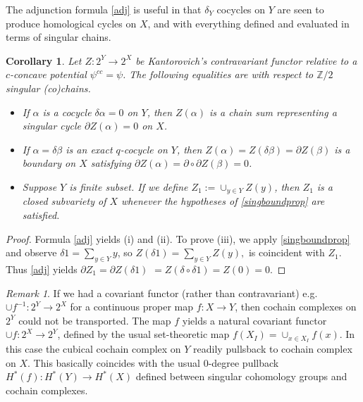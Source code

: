 \documentclass[12pt]{amsart}
\newtheorem{cor}{Corollary}
\theoremstyle{definition}
\theoremstyle{remark}
\newtheorem{rem}{Remark}
\newcommand{\bZ}{\mathbb{Z}}
\newcommand{\del}{\partial}
\begin{document}
The adjunction formula \eqref{adj} is useful in that $\delta_Y$ cocycles on $Y$ are seen to produce homological cycles on $X$, and with everything defined and evaluated in terms of singular chains. %

\begin{cor} \label{cycle}
Let $Z:2^Y \to 2^X$ be Kantorovich's contravariant functor relative to a $c$-concave potential $\psi^{cc}=\psi$. The following equalities are with respect to $\bZ/2$ singular (co)chains. 
\begin{itemize}
\item[(i)] If $\alpha$ is a cocycle $\delta \alpha = 0$ on $Y$, then $Z(\alpha)$ is a chain sum representing a singular cycle $\del Z(\alpha)=0$ on $X$. 
\item[(ii)] If $\alpha=\delta \beta$ is an exact $q$-cocycle on $Y$, then $Z(\alpha)=Z(\delta \beta)=\del Z(\beta)$ is a boundary on $X$ satisfying $\del Z(\alpha)=\del \circ \del Z(\beta)=0$.
\item[(iii)] Suppose $Y$ is finite subset. If we define $Z_1:=\cup_{y\in Y} Z(y)$, then $Z_1$ is a closed subvariety of $X$ whenever the hypotheses of \ref{singboundprop} are satisfied. 
\end{itemize}
\end{cor}
\begin{proof}
Formula \eqref{adj} yields (i) and (ii). To prove (iii), we apply \ref{singboundprop} and observe $\delta 1= \sum_{y\in Y} y$, so $Z(\delta 1)=\sum_{y\in Y} Z(y),$ is coincident with $Z_1$. Thus \eqref{adj} yields $\del Z_1=\del Z(\delta 1)$ $=Z(\delta \circ \delta 1)=Z(0)=0.$ 
\end{proof}



\begin{rem}
If we had a covariant functor (rather than contravariant) e.g. $\cup f^{-1}: 2^Y \to 2^X$ for a continuous proper map $f: X\to Y$, then cochain complexes on $2^Y$ could not be transported. The map $f$ yields a natural covariant functor $\cup f: 2^X \to 2^Y$, defined by the usual set-theoretic map $f(X_I)=\cup_{x\in X_I} f(x)$. In this case the cubical cochain complex on $Y$ readily pullsback to cochain complex on $X$. This basically coincides with the usual $0$-degree pullback $H^*(f): H^*(Y) \to H^*(X)$ defined between singular cohomology groups and cochain complexes. 
\end{rem}



\printbibliography[title={References}]
\end{document}
